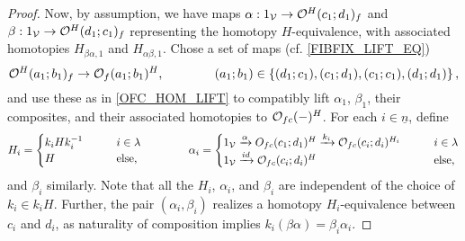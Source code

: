 \documentclass[a4paper,10pt
,draft
]{article}%
\renewcommand{\1}{\ensuremath{\mathbb{id}}}
\begin{document}
\begin{proof}
      Now, by assumption, we have maps
      $\alpha: 1_{\mathcal V} \to \mathcal{O}^H(c_1;d_1)_f$ and $\beta: 1_{\mathcal V} \to \mathcal{O}^H(d_1;c_1)_f$
      representing the homotopy $H$-equivalence,
      with associated homotopies $H_{\beta\alpha,1}$ and $H_{\alpha\beta,1}$.
      Chose a set of maps (cf. \eqref{FIBFIX_LIFT_EQ})
      \begin{equation}
            \mathcal{O}^H(a_1;b_1)_f \to \mathcal{O}_f(a_1;b_1)^H,
            \qquad \qquad
            (a_1;b_1) \in  \left\{(d_1;c_1), (c_1;d_1), (c_1;c_1), (d_1;d_1)\right\},
      \end{equation}
      and use these as in \eqref{OFC_HOM_LIFT} to compatibly lift
      $\alpha_1$, $\beta_1$, their composites, and their associated homotopies to $\mathcal{O}_{f c}(-)^H$.
      For each $i \in \underline{n}$, define
      \begin{equation}
            \label{WEAKEQCOLORS_EQ}
            H_i =
            \begin{cases}
                  k_i H k_i^{-1} \qquad & i \in \lambda
                  \\
                  H & \mbox{else,}
            \end{cases}
            \qquad
            \qquad 
            \alpha_i =
            \begin{cases}
                  1_{\mathcal V} \xrightarrow{\alpha} O_{f c}(c_1;d_1)^H \xrightarrow{k_i} \mathcal{O}_{f c}(c_i;d_i)^{H_i} \qquad & i \in \lambda
                  \\
                  1_{\mathcal V} \xrightarrow{id} \mathcal{O}_{f c}(c_i;d_i)^H & \mbox{else},
            \end{cases}
      \end{equation}
      and $\beta_i$ similarly.
      Note that all the $H_i$, $\alpha_i$, and $\beta_i$ are independent of the choice of $k_i\in k_i H$.
      Further, 
      the pair $(\alpha_i,\beta_i)$ realizes a homotopy $H_i$-equivalence between $c_i$ and $d_i$,
      as naturality of composition implies
      $k_i (\beta\alpha) = \beta_i\alpha_i$.
      

\end{proof}
\end{document}
